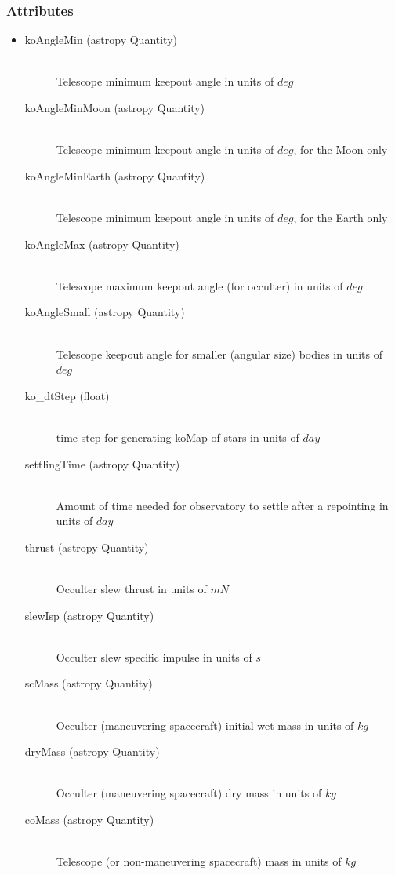 \documentclass[cleanfoot]{asme2ej}
\begin{document}
\subsubsection*{Attributes}
\begin{itemize}
\item
\begin{description}
    \item[koAngleMin (astropy Quantity)] \hfill \\ Telescope minimum keepout angle in units of $deg$
    \item[koAngleMinMoon (astropy Quantity)] \hfill \\ Telescope minimum keepout angle in units of $deg$, for the Moon only
    \item[koAngleMinEarth (astropy Quantity)] \hfill \\ Telescope minimum keepout angle in units of $deg$, for the Earth only
    \item[koAngleMax (astropy Quantity)] \hfill \\ Telescope maximum keepout angle (for occulter) in units of $deg$
    \item[koAngleSmall (astropy Quantity)] \hfill \\ Telescope keepout angle for smaller (angular size) bodies in units of $deg$
    \item[ko\_dtStep (float)] \hfill \\ time step for generating koMap of stars  in units of $ day $ 
    \item[settlingTime (astropy Quantity)] \hfill \\ Amount of time needed for observatory to settle after a repointing in units of $ day $
    \item[thrust (astropy Quantity)] \hfill \\ Occulter slew thrust in units of $ mN $
    \item[slewIsp (astropy Quantity)] \hfill \\ Occulter slew specific impulse in units of $ s $
    \item[scMass (astropy Quantity)] \hfill \\ Occulter (maneuvering spacecraft) initial wet mass in units of $ kg $
    \item[dryMass (astropy Quantity)] \hfill \\ Occulter (maneuvering spacecraft) dry mass in units of $ kg $
    \item[coMass (astropy Quantity)] \hfill \\ Telescope (or non-maneuvering spacecraft) mass in units of $ kg $

\end{description}
\end{itemize}
\end{document}

